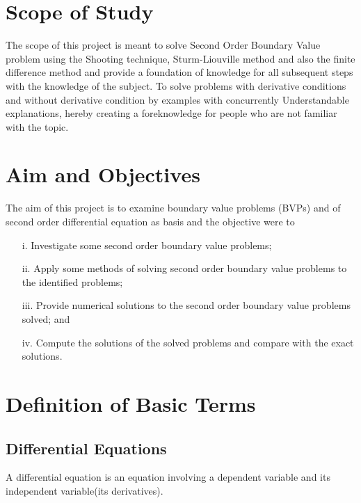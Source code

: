 \documentclass[12pt]{report}
\begin{document}
	\section{Scope of Study}
	The scope of this project is meant to solve Second Order Boundary Value problem using the Shooting technique, Sturm-Liouville method and also the finite difference method and provide a foundation of knowledge for all subsequent steps with the knowledge of the subject.  To solve problems with derivative conditions and without derivative condition by examples with concurrently Understandable explanations, hereby creating a foreknowledge for people who are not familiar with the topic.
	
	\section{Aim and Objectives}
	The aim of this project is to examine boundary value problems (BVPs) and of second order differential equation as basis and the objective were to 
	\begin{enumerate}
		\item[i.] Investigate some second order boundary value problems;
		
		\item[ii.] Apply some methods of solving second order boundary value problems to the identified problems;
		
		\item[iii.]Provide numerical solutions to the second order boundary value problems solved; and 
		
		\item[iv.] Compute the solutions of the solved problems and compare with the exact solutions.
	\end{enumerate}
	
	\section{Definition of Basic Terms}
	
	\subsection{Differential Equations}
	A differential equation is an equation involving a dependent variable and its independent variable(its derivatives).\\
	
\end{document}
